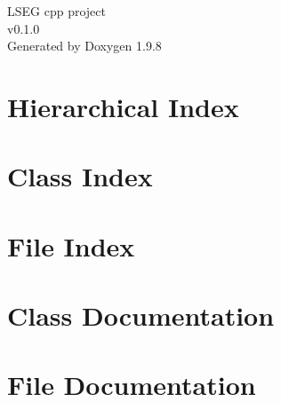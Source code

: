 \documentclass[twoside]{book}
\newcommand{\+}{\discretionary{\mbox{\scriptsize$\hookleftarrow$}}{}{}}
\newcommand{\clearemptydoublepage}{%
    \newpage{\pagestyle{empty}\cleardoublepage}%
  }
\begin{document}
  \raggedbottom
    \hypersetup{pageanchor=false,
                bookmarksnumbered=true,
                pdfencoding=unicode
               }
  \begin{titlepage}
  \vspace*{7cm}
  \begin{center}%
  {\Large LSEG cpp project}\\
  [1ex]\large v0.\+1.\+0 \\
  \vspace*{1cm}
  {\large Generated by Doxygen 1.9.8}\\
  \end{center}
  \end{titlepage}
  \clearemptydoublepage
  \tableofcontents
  \clearemptydoublepage
  \hypersetup{pageanchor=true}

\chapter{Hierarchical Index}

\chapter{Class Index}

\chapter{File Index}

\chapter{Class Documentation}












\chapter{File Documentation}



  \backmatter
  \newpage
  \clearemptydoublepage
  \printindex
\end{document}
